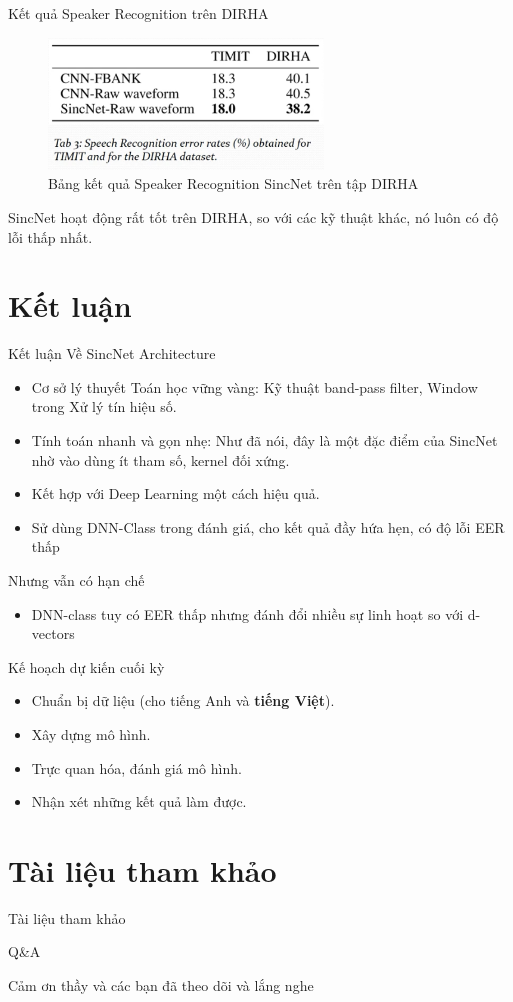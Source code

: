 \documentclass[11pt]{beamer}
\begin{document}
\begin{frame}{Kết quả Speaker Recognition trên DIRHA}
	\begin{figure}[H]
		\centering
		\includegraphics[width=0.65\textwidth]{images/sr_sincnet_result.png}
		\caption{Bảng kết quả Speaker Recognition SincNet trên tập DIRHA}
		\label{fig:writing-thesis}
	\end{figure}
	SincNet hoạt động rất tốt trên DIRHA, so với các kỹ thuật khác, nó luôn có độ lỗi thấp nhất.	
\end{frame}

\section{Kết luận}
\begin{frame}{Kết luận}
	Về SincNet Architecture
	\begin{itemize}
		\item Cơ sở lý thuyết Toán học vững vàng: Kỹ thuật band-pass filter, Window trong Xử lý tín hiệu số.
		\item Tính toán nhanh và gọn nhẹ: Như đã nói, đây là một đặc điểm của SincNet nhờ vào dùng ít tham số, kernel đối xứng.
		\item Kết hợp với Deep Learning một cách hiệu quả.
		\item Sử dùng DNN-Class trong đánh giá, cho kết quả đầy hứa hẹn, có độ lỗi EER thấp
	\end{itemize}
	Nhưng vẫn có hạn chế
	\begin{itemize}
		\item DNN-class tuy có EER thấp nhưng đánh đổi nhiều sự linh hoạt so với d-vectors
	\end{itemize}
\end{frame}
\begin{frame}{Kế hoạch dự kiến cuối kỳ}
	\begin{itemize}
		\item Chuẩn bị dữ liệu (cho tiếng Anh và \textbf{tiếng Việt}).
		\item Xây dựng mô hình.
		\item Trực quan hóa, đánh giá mô hình.
		\item Nhận xét những kết quả làm được.
	\end{itemize}
\end{frame}

\section{Tài liệu tham khảo}
\begin{frame}{Tài liệu tham khảo}
	\nocite{*}
	\newpage\cleardoublepage
	
\end{frame}


\begin{frame}{Q\&A}
	\begin{center}
		\Huge Cảm ơn thầy và các bạn đã theo dõi và lắng nghe
	\end{center}
\end{frame}
\end{document}
